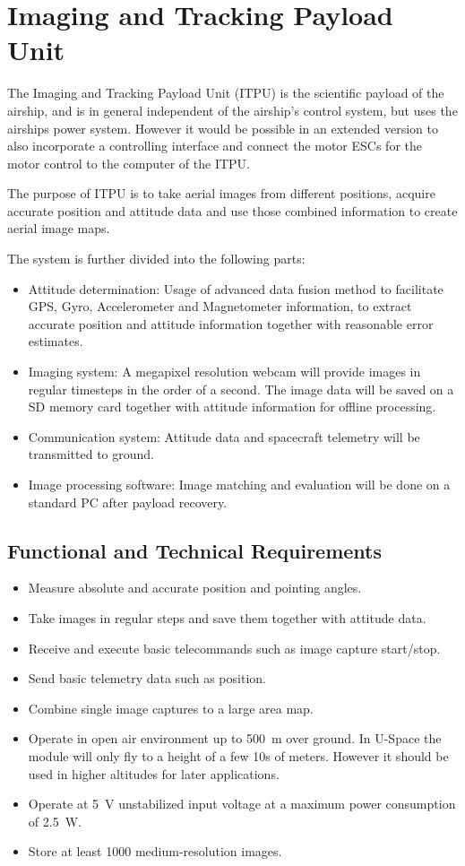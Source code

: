 \chapter{Imaging and Tracking Payload Unit}
\label{chap:itpu}

The Imaging and Tracking Payload Unit (ITPU) is the scientific payload of the
airship, and is in general independent of the airship's control system, but uses
the airships power system. However it would be possible in an extended version
to also incorporate a controlling interface and connect the motor ESCs for the
motor control to the computer of the ITPU. 

The purpose of ITPU is to take aerial images from different positions, acquire
accurate position and attitude data and use those combined information to create
aerial image maps. 

The system is further divided into the following parts:
\begin{itemize}
\item Attitude determination: Usage of advanced data fusion method to facilitate
GPS, Gyro, Accelerometer and Magnetometer information, to extract accurate
position and attitude information together with reasonable error estimates.
\item Imaging system: A megapixel resolution webcam will provide images in
regular timesteps in the order of a second.
The image data will be saved on a SD memory card together with attitude
information for offline processing.
\item Communication system: Attitude data and spacecraft telemetry will be
transmitted to ground.
\item Image processing software:
Image matching and evaluation will be done on a standard PC after payload
recovery.
\end{itemize}

\section{Functional and Technical Requirements}

\begin{itemize}
\item Measure absolute and accurate position and pointing angles.
\item Take images in regular steps and save them together with attitude data.
\item Receive and execute basic telecommands such as image capture start/stop.
\item Send basic telemetry data such as position.
\item Combine single image captures to a large area map.
\item Operate in open air environment up to 500~m over ground. In U-Space the
module will only fly to a height of a few 10s of meters. However it should be
used in higher altitudes for later applications.
\item Operate at 5~V unstabilized input voltage at a maximum power consumption
of 2.5~W.
\item Store at least 1000 medium-resolution images.
\end{itemize}


